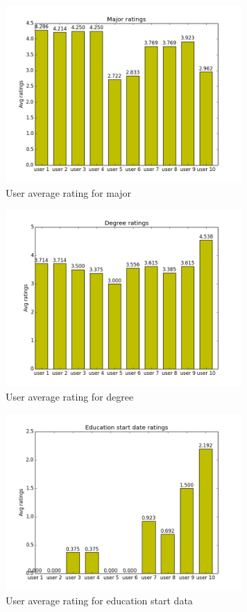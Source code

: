 \begin{figure}[H]
\centering
\includegraphics[width=90mm]{images/evaluation/average_major_score.png}
\caption{User average rating for major}
\label{fig:major}
\end{figure}

\begin{figure}[H]
\centering
\includegraphics[width=90mm]{images/evaluation/average_degree_score.png}
\caption{User average rating for degree}
\label{fig:degree}
\end{figure}

\begin{figure}[H]
\centering
\includegraphics[width=90mm]{images/evaluation/average_education_start_date_score.png}
\caption{User average rating for education start data}
\label{fig:educationstart}
\end{figure}

